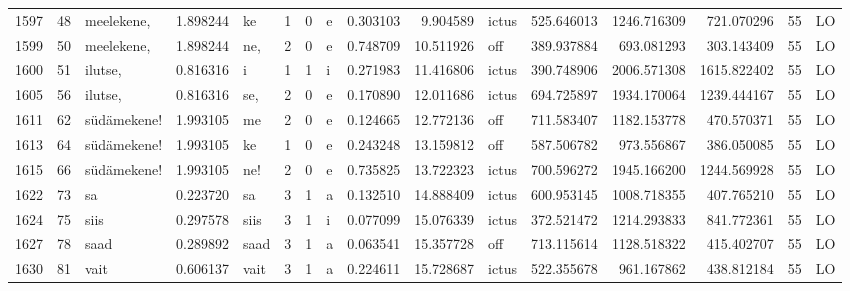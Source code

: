 \begin{tabular}{lrlrllllrrlrrrll}
1597 &          48 &       meelekene, &  1.898244 &      ke &        1 &      0 &       e &      0.303103 &      9.904589 &  ictus &   525.646013 &  1246.716309 &   721.070296 &     55 &        LO \\
1599 &          50 &       meelekene, &  1.898244 &     ne, &        2 &      0 &       e &      0.748709 &     10.511926 &    off &   389.937884 &   693.081293 &   303.143409 &     55 &        LO \\
1600 &          51 &          ilutse, &  0.816316 &       i &        1 &      1 &       i &      0.271983 &     11.416806 &  ictus &   390.748906 &  2006.571308 &  1615.822402 &     55 &        LO \\
1605 &          56 &          ilutse, &  0.816316 &     se, &        2 &      0 &       e &      0.170890 &     12.011686 &  ictus &   694.725897 &  1934.170064 &  1239.444167 &     55 &        LO \\
1611 &          62 &      südämekene! &  1.993105 &      me &        2 &      0 &       e &      0.124665 &     12.772136 &    off &   711.583407 &  1182.153778 &   470.570371 &     55 &        LO \\
1613 &          64 &      südämekene! &  1.993105 &      ke &        1 &      0 &       e &      0.243248 &     13.159812 &    off &   587.506782 &   973.556867 &   386.050085 &     55 &        LO \\
1615 &          66 &      südämekene! &  1.993105 &     ne! &        2 &      0 &       e &      0.735825 &     13.722323 &  ictus &   700.596272 &  1945.166200 &  1244.569928 &     55 &        LO \\
1622 &          73 &               sa &  0.223720 &      sa &        3 &      1 &       a &      0.132510 &     14.888409 &  ictus &   600.953145 &  1008.718355 &   407.765210 &     55 &        LO \\
1624 &          75 &             siis &  0.297578 &    siis &        3 &      1 &       i &      0.077099 &     15.076339 &  ictus &   372.521472 &  1214.293833 &   841.772361 &     55 &        LO \\
1627 &          78 &             saad &  0.289892 &    saad &        3 &      1 &       a &      0.063541 &     15.357728 &    off &   713.115614 &  1128.518322 &   415.402707 &     55 &        LO \\
1630 &          81 &             vait &  0.606137 &    vait &        3 &      1 &       a &      0.224611 &     15.728687 &  ictus &   522.355678 &   961.167862 &   438.812184 &     55 &        LO \\

\end{tabular}
